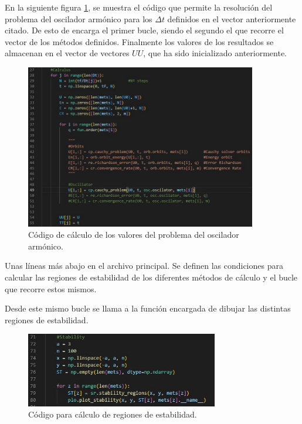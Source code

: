\documentclass[12pt,a4paper]{article}
\begin{document}
En la siguiente figura \ref{main3}, se muestra el código que permite la resolución del problema del oscilador armónico para los $\Delta t$ definidos en el vector anteriormente citado. De esto de encarga el primer bucle, siendo el segundo el que recorre el vector de los métodos definidos. Finalmente los valores de los resultados se almacenan en el vector de vectores $UU$, que ha sido inicializado anteriormente.  
\begin{figure}[H]
	\centering
	\includegraphics[width=0.9\textwidth]{FIGURES/mil4/codigo/main3.JPG}
	\caption{Código de cálculo de los valores del problema del oscilador armónico.}
	\label{main3}
\end{figure}

Unas líneas más abajo en el archivo principal. Se definen las condiciones para calcular las regiones de estabilidad de los diferentes métodos de cálculo y el bucle que recorre estos mismos. 

Desde este mismo bucle se llama a la función encargada de dibujar las distintas regiones de estabilidad. 
\begin{figure}[H]
	\centering
	\includegraphics[width=0.75\textwidth]{FIGURES/mil4/codigo/main1.JPG}
	\caption{Código para cálculo de regiones de estabilidad.}
	\label{main1}
\end{figure}
\end{document}
